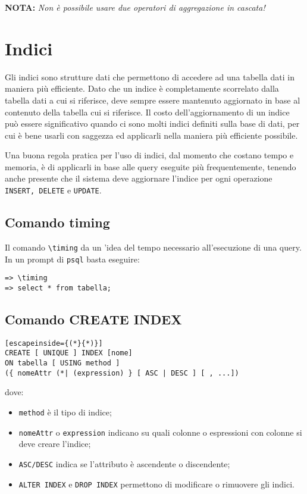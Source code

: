 \documentclass[a4paper, 10pt, titlepage]{article}
\begin{document}
		\noindent
		\textbf{NOTA: } \textit{Non è possibile usare due operatori di aggregazione in cascata!}
	\newpage		
	\section{Indici}
	Gli indici sono strutture dati che permettono di accedere ad una tabella dati in maniera più efficiente. Dato che un indice è completamente scorrelato dalla tabella dati a cui si riferisce, deve sempre essere mantenuto aggiornato in base al contenuto della tabella cui si riferisce. Il costo dell'aggiornamento di un indice può essere significativo quando ci sono molti indici definiti sulla base di dati, per cui è bene usarli con saggezza ed applicarli nella maniera più efficiente possibile.
	
	Una buona regola pratica per l'uso di indici, dal momento che costano tempo e memoria, è di applicarli in base alle query eseguite più frequentemente, tenendo anche presente che il sistema deve aggiornare l'indice per ogni operazione \lstinline|INSERT, DELETE| e \lstinline|UPDATE|.
	
	\subsection{Comando timing}
	Il comando \lstinline|\timing| da un 'idea del tempo necessario all'esecuzione di una query.
	In un prompt di \verb|psql| basta eseguire:
	\begin{lstlisting}
=> \timing
=> select * from tabella;
	\end{lstlisting}

	\subsection{Comando CREATE INDEX} \label{createindex}
	\begin{lstlisting}[escapeinside={(*}{*)}]
CREATE [ UNIQUE ] INDEX [nome]
ON tabella [ USING method ]
({ nomeAttr (*| (expression) } [ ASC | DESC ] [ , ...])
	\end{lstlisting}
	dove:
	\begin{itemize}
		\item \verb|method| è il tipo di indice;
		\item \verb|nomeAttr| o \verb|expression| indicano su quali colonne o espressioni con colonne si deve creare l'indice;
		\item \lstinline|ASC/DESC| indica se l'attributo è ascendente o discendente;
		\item \lstinline|ALTER INDEX| e \lstinline|DROP INDEX| permettono di modificare o rimuovere gli indici.
	\end{itemize}
\end{document}
